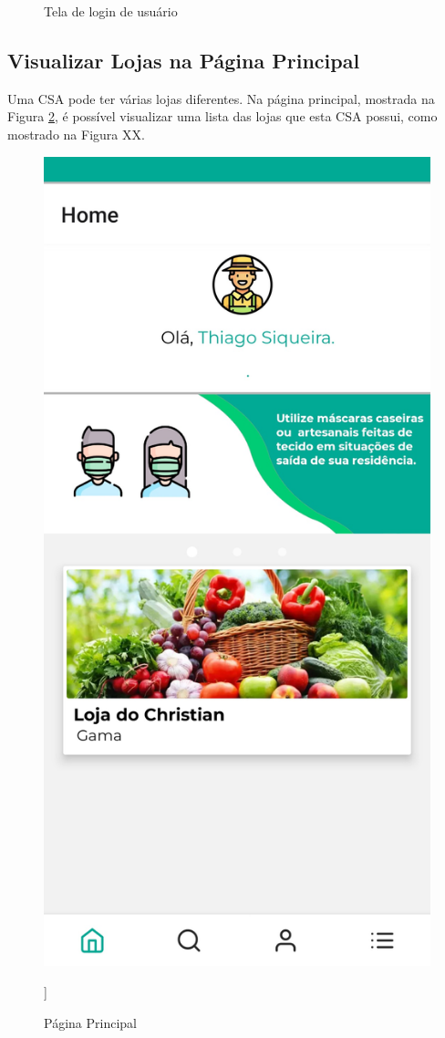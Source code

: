 \begin{figure}[h]
	\caption{Tela de login de usuário}
        \label{tela-login-csa-app}
\end{figure}

\subsection{Visualizar Lojas na Página Principal}
Uma CSA pode ter várias lojas diferentes. Na página principal, mostrada na Figura \ref{tela-principal-loja-app}, é possível visualizar uma lista das lojas que esta CSA possui, como mostrado na Figura XX.

\begin{figure}[h]
	\centering
	\includegraphics[keepaspectratio=true,scale=0.16]{figuras/principal.jpg}
	\caption{Página Principal}]
        \label{tela-principal-loja-app}
\end{figure}


